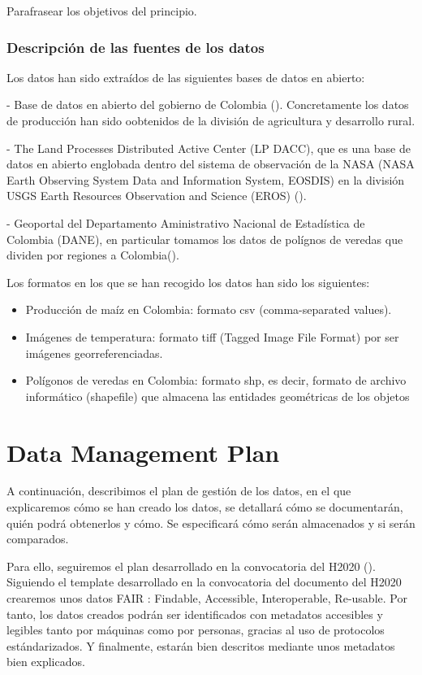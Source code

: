 \documentclass[12pt, spanish]{article}
\begin{document}
Parafrasear los objetivos del principio.

\subsubsection{Descripción de las fuentes de los datos}

Los datos han sido extraídos de las siguientes bases de datos en abierto: 

- Base de datos en abierto del gobierno de Colombia (\cite{GobiernodeColombia2018}). Concretamente los datos de producción han sido oobtenidos de la división de agricultura y desarrollo rural.

- The Land Processes Distributed Active Center (LP DACC), que es una base de datos en abierto englobada dentro del sistema de observación de la NASA (NASA Earth Observing System Data and Information System, EOSDIS) en la división USGS Earth Resources Observation and Science (EROS) (\cite{NASALPDAACattheUSGSEROSCenter2019}).

- Geoportal del Departamento Aministrativo Nacional de Estadística de Colombia (DANE), en particular tomamos los datos de polígnos de veredas que dividen por regiones a Colombia(\cite{DANECOL2017}).

Los formatos en los que se han recogido los datos han sido los siguientes:
\begin{itemize}
    \item Producción de maíz en Colombia: formato csv (comma-separated values).
    \item Imágenes de temperatura: formato tiff (Tagged Image File Format) por ser imágenes georreferenciadas.
    \item Polígonos de veredas en Colombia: formato shp, es decir, formato de archivo informático (shapefile) que almacena las entidades geométricas de los objetos
\end{itemize}

\section{Data Management Plan}

A continuación, describimos el plan de gestión de los datos, en el que explicaremos cómo se han creado los datos, se detallará cómo se documentarán, quién podrá obtenerlos y cómo. Se especificará cómo serán almacenados y si serán comparados. 

Para ello, seguiremos el plan desarrollado en la convocatoria del H2020 (\cite{horizon2020dmp2019}). Siguiendo el template desarrollado en la convocatoria del documento del H2020 crearemos unos datos FAIR : Findable, Accessible, Interoperable, Re-usable. Por tanto, los datos creados podrán ser identificados con metadatos accesibles y legibles tanto por máquinas como por personas, gracias al uso de protocolos estándarizados. Y finalmente, estarán bien descritos mediante unos metadatos bien explicados. 
\end{document}
